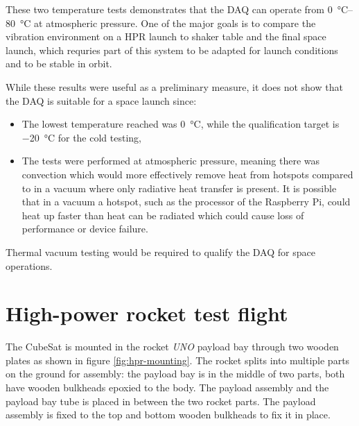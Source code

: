 \documentclass[]{report}
\begin{document}
These two temperature tests demonstrates that the DAQ can operate from \SIrange{0}{80}{\degreeCelsius} at atmospheric pressure. One of the major goals is to compare the vibration environment on a HPR launch to shaker table and the final space launch, which requries part of this system to be adapted for launch conditions and to be stable in orbit.

While these results were useful as a preliminary measure, it does not show that the DAQ is suitable for a space launch since:
\begin{itemize}
  \item The lowest temperature reached was \SI{0}{\degreeCelsius}, while the qualification target is \SI{-20}{\degreeCelsius} for the cold testing,
  \item The tests were performed at atmospheric pressure, meaning there was convection which would more effectively remove heat from hotspots compared to in a vacuum where only radiative heat transfer is present. It is possible that in a vacuum a hotspot, such as the processor of the Raspberry Pi, could heat up faster than heat can be radiated which could cause loss of performance or device failure.
\end{itemize}

Thermal vacuum testing would be required to qualify the DAQ for space operations.

\section{High-power rocket test flight}

The CubeSat is mounted in the rocket \textit{UNO} payload bay through two wooden plates as shown in figure \ref{fig:hpr-mounting}. The rocket splits into multiple parts on the ground for assembly: the payload bay is in the middle of two parts, both have wooden bulkheads epoxied to the body. The payload assembly and the payload bay tube is placed in between the two rocket parts. The payload assembly is fixed to the top and bottom wooden bulkheads to fix it in place.
\end{document}
